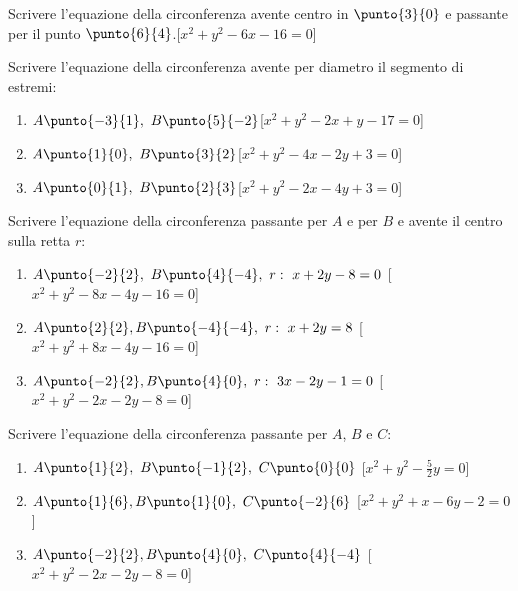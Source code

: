 \begin{esercizio}\label{ese:}
Scrivere l'equazione della circonferenza avente centro in \(\punto{3}{0}\) e 
passante per il punto \(\punto{6}{4}\).\hfill[\(x^2+y^2-6x-16=0\)]
\end{esercizio}

\begin{esercizio}\label{ese:}
Scrivere l'equazione della circonferenza avente per diametro il segmento di 
estremi:
\begin{enumerate} [label=\alph*), nosep]
  \item  \(A\punto{-3}{1},~B\punto{5}{-2}\)\hfill [\(x^2+y^2-2x+y-17=0\)]
  \item  \(A\punto{1}{0},~B\punto{3}{2}\)\hfill [\(x^2+y^2-4x-2y+3=0\)]
  \item  \(A\punto{0}{1},~B\punto{2}{3}\)\hfill [\(x^2+y^2-2x-4y+3=0\)]
 \end{enumerate}
\end{esercizio}

\begin{esercizio}\label{ese:}
Scrivere l'equazione della circonferenza passante per \(A\) e per \(B\) e 
avente il centro sulla retta \(r\):
\begin{enumerate} [label=\alph*), nosep]
  \item  \(A\punto{-2}{2},~B\punto{4}{-4},~r:~x+2y-8=0\)
  \hfill [\(x^2+y^2-8x-4y-16=0\)]
  \item  \(A\punto{2}{2}, B\punto{-4}{-4},~r:~x+2y=8\)
  \hfill [\(x^2+y^2+8x-4y-16=0\)]
  \item  \(A\punto{-2}{2}, B\punto{4}{0},~r:~3x-2y-1=0\)
  \hfill [\(x^2+y^2-2x-2y-8=0\)]
 \end{enumerate}
\end{esercizio}

\begin{esercizio}\label{ese:}
Scrivere l'equazione della circonferenza passante per \(A\), \(B\) e \(C\):
\begin{enumerate} [label=\alph*), nosep]
  \item  \(A\punto{1}{2},~B\punto{-1}{2},~C\punto{0}{0}\)
  \hfill [\(x^2+y^2-\frac{5}{2}y=0\)]
  \item  \(A\punto{1}{6}, B\punto{1}{0},~C\punto{-2}{6}\)
  \hfill [\(x^2+y^2+x-6y-2=0\)]
  \item  \(A\punto{-2}{2}, B\punto{4}{0},~C\punto{4}{-4}\)
  \hfill [\(x^2+y^2-2x-2y-8=0\)]
 \end{enumerate}
\end{esercizio}

